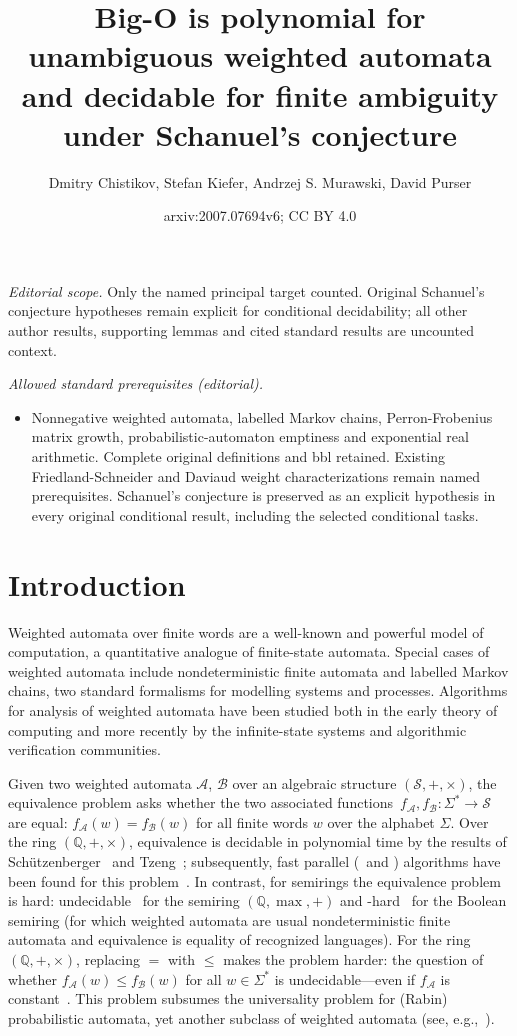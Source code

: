 \documentclass[10pt,a4paper]{amsart}
\title{Big-O is polynomial for unambiguous weighted automata and decidable for finite ambiguity under Schanuel's conjecture}
\author{Dmitry Chistikov, Stefan Kiefer, Andrzej S. Murawski, David Purser}
\date{arxiv:2007.07694v6; CC BY 4.0}
\numberwithin{equation}{section}
\theoremstyle{plain}
\theoremstyle{definition}
\theoremstyle{remark}
\begin{document}
\maketitle
\noindent\textit{Editorial scope.} Only the named principal target counted. Original Schanuel's conjecture hypotheses remain explicit for conditional decidability; all other author results, supporting lemmas and cited standard results are uncounted context.\par\medskip
\noindent\textit{Allowed standard prerequisites (editorial).}\begin{itemize}
\item Nonnegative weighted automata, labelled Markov chains, Perron-Frobenius matrix growth, probabilistic-automaton emptiness and exponential real arithmetic. Complete original definitions and bbl retained. Existing Friedland-Schneider and Daviaud weight characterizations remain named prerequisites. Schanuel's conjecture is preserved as an explicit hypothesis in every original conditional result, including the selected conditional tasks.
\end{itemize}\medskip
\section{Introduction}\label{sec:intro}

Weighted automata over finite words
are a well-known and powerful model of computation,
a quantitative analogue of finite-state automata.
Special cases of weighted automata include
nondeterministic finite automata
and labelled Markov chains, two standard formalisms for modelling systems
and processes.
Algorithms for analysis of weighted automata have been studied
both in the early theory of computing and
more recently by the infinite-state systems and algorithmic verification
communities.

Given two weighted automata $\mathcal A$, $\mathcal B$
over an algebraic structure $(\mathcal S, {+}, {\times})$,
the equivalence problem asks whether the two associated functions~$f_{\mathcal A}, f_{\mathcal B} \colon \Sigma^* \to \mathcal S$
are equal: $f_{\mathcal A}(w) = f_{\mathcal B}(w)$ for all finite
words $w$ over the alphabet $\Sigma$.
Over the ring $(\mathbb Q, {+}, {\times})$,
equivalence
is decidable in polynomial time by the results of
Sch\"utzenberger~\cite{schutzenberger1961definition} and Tzeng~\cite{tzeng1992polynomial};
subsequently, fast parallel (\NC\ and \RNC) algorithms have been found
for this problem~\cite{Tzeng96,kiefer2013complexity}.
In contrast, for semirings the equivalence problem is hard:
undecidable~\cite{Krob94,AlmagorBK11} for the semiring $(\mathbb Q, {\max}, {+})$
and \PSPACE-hard~\cite{MS72} for the Boolean semiring
(for which weighted automata are usual nondeterministic finite automata
 and equivalence is equality of recognized languages).
For the ring $(\mathbb Q, {+}, {\times})$, replacing $=$ with $\le$ makes the problem harder:
the question of whether $f_{\mathcal A}(w) \le f_{\mathcal B}(w)$
for all $w \in \Sigma^*$ is undecidable---even if $f_{\mathcal A}$ is constant~\cite{paz2014introduction}.
This problem subsumes the universality problem for (Rabin) probabilistic automata,
yet another subclass of weighted automata (see, e.g.,~\cite{fijalkow2017undecidability}).
\end{document}
